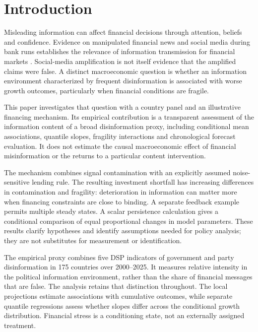 \section{Introduction}\label{sec:intro}

Misleading information can affect financial decisions through attention,
beliefs and confidence. Evidence on manipulated financial news and social
media during bank runs establishes the relevance of information transmission
for financial markets \citep{kogan2023social,clarke2021fake,cookson2023social}.
Social-media amplification is not itself evidence that the amplified claims
were false. A distinct macroeconomic question is whether an information
environment characterized by frequent disinformation is associated with worse
growth outcomes, particularly when financial conditions are fragile.

This paper investigates that question with a country panel and an
illustrative financing mechanism. Its empirical contribution is a transparent
assessment of the information content of a broad disinformation proxy,
including conditional mean associations, quantile slopes, fragility
interactions and chronological forecast evaluation. It does not estimate
the causal macroeconomic effect of financial misinformation or the returns
to a particular content intervention.

The mechanism combines signal contamination with an explicitly assumed
noise-sensitive lending rule. The resulting investment shortfall has
increasing differences in contamination and fragility: deterioration in
information can matter more when financing constraints are close to binding.
A separate feedback example permits multiple steady states. A scalar
persistence calculation gives a conditional comparison of equal proportional
changes in model parameters. These results clarify hypotheses and identify
assumptions needed for policy analysis; they are not substitutes for
measurement or identification.

The empirical proxy combines five DSP indicators of government and party
disinformation in 175 countries over 2000--2025. It measures relative intensity
in the political information environment, rather than the share of financial
messages that are false. The analysis retains that distinction
throughout. The local projections estimate associations with cumulative
outcomes, while separate quantile regressions assess whether slopes differ
across the conditional growth distribution. Financial stress is a
conditioning state, not an externally assigned treatment.

